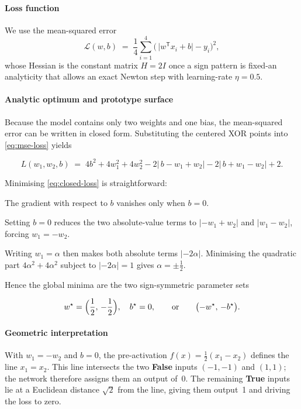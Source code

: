 \paragraph{Loss function}
We use the mean-squared error
\begin{equation}
    \mathcal{L}(w,b)
    \;=\;
    \frac{1}{4} \sum_{i=1}^{4} 
    \bigl(\,\lvert w^{\mathsf T}x_i + b\rvert - y_i\bigr)^2,
    \label{eq:mse-loss}
\end{equation}
whose Hessian is the constant matrix \(H = 2I\) once a sign pattern is
fixed-an analyticity that allows an exact Newton step with learning-rate
\(\eta = 0.5\).

\paragraph{Analytic optimum and prototype surface}
Because the model contains only two weights and one bias, the mean-squared
error can be written in closed form.  Substituting the centered XOR points into
\eqref{eq:mse-loss} yields

\[
  L(w_1,w_2,b)\;=\;
  4b^2 + 4w_1^2 + 4w_2^2
  - 2\bigl|\,b-w_1+w_2\bigr|
  - 2\bigl|\,b+w_1-w_2\bigr| + 2.
  \tag{1}\label{eq:closed-loss}
\]

Minimising \eqref{eq:closed-loss} is straightforward:

\begin{enumerate*}[label=(\roman*)]
  \item The gradient with respect to \(b\) vanishes only when
        \(b = 0\).
  \item Setting \(b=0\) reduces the two absolute-value terms to
        \(\lvert -w_1+w_2\rvert\) and \(\lvert w_1-w_2\rvert\),
        forcing \(w_1 = -w_2\).
  \item Writing \(w_1 = \alpha\) then makes both absolute terms
        \(\lvert -2\alpha\rvert\).  Minimising the quadratic part
        \(4\alpha^2 + 4\alpha^2\) subject to
        \(\lvert -2\alpha\rvert = 1\) gives \(\alpha = \pm\tfrac12\).
\end{enumerate*}

Hence the global minima are the two sign-symmetric parameter sets

\[
  w^\star = \Bigl(\frac12,\,-\frac12\Bigr),\quad b^\star = 0,
  \qquad\text{or}\qquad
  \bigl(-w^\star,\,-b^\star\bigr).
\]

\paragraph{Geometric interpretation}
With \(w_1=-w_2\) and \(b=0\), the pre-activation
\(f(x)=\tfrac12(x_1-x_2)\) defines the line \(x_1=x_2\).
This line intersects the two \textbf{False} inputs
\(({-}1,{-}1)\) and \((1,1)\); the network therefore assigns them an output
of~0.  
The remaining \textbf{True} inputs lie at a Euclidean distance
\(\sqrt2\) from the line, giving them output~1 and driving the loss to zero.

